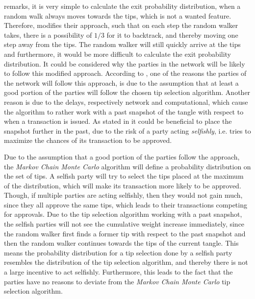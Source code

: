 \cite{tangle} remarks, it is very simple to calculate the exit probability distribution, when a random walk always moves towards the tips, which is not a wanted feature. Therefore, \cite{tangle} modifies their approach, such that on each step the random walker takes, there is a possibility of $1/3$ for it to backtrack, and thereby moving one step away from the tips. The random walker will still quickly arrive at the tips and furthermore, it would be more difficult to calculate the exit probability distribution. It could be considered why the parties in the network will be likely to follow this modified approach. According to \cite{tangle}, one of the reasons the parties of the network will follow this approach, is due to the assumption that at least a good portion of the parties will follow the chosen tip selection algorithm. Another reason is due to the delays, respectively network and computational, which cause the algorithm to rather work with a past snapshot of the tangle with respect to when a transaction is issued. As stated in \cite{tangle} it could be beneficial to place the snapshot further in the past, due to the risk of a party acting \emph{selfishly}, i.e. tries to maximize the chances of its transaction to be approved. 

Due to the assumption that a good portion of the parties follow the approach, the \emph{Markov Chain Monte Carlo} algorithm will define a probability distribution on the set of tips. A selfish party will try to select the tips placed at the maximum of the distribution, which will make its transaction more likely to be approved. Though, if multiple parties are acting selfishly, then they would not gain much, since they all approve the same tips, which leads to their transactions competing for approvals. Due to the tip selection algorithm working with a past snapshot, the selfish parties will not see the cumulative weight increase immediately, since the random walker first finds a former tip with respect to the past snapshot and then the random walker continues towards the tips of the current tangle. This means the probability distribution for a tip selection done by a selfish party resembles the distribution of the tip selection algorithm, and thereby there is not a large incentive to act selfishly. Furthermore, this leads to the fact that the parties have no reasons to deviate from the \emph{Markov Chain Monte Carlo} tip selection algorithm.

